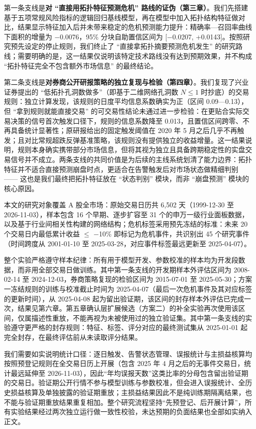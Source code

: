 \documentclass[12pt,a4paper]{ctexart}
\begin{document}
第一条支线是\textbf{对 “直接用拓扑特征预测危机” 路线的证伪（第三章）}。我们先搭建基于五项常规风险指标的逻辑回归基线模型，再在模型中加入拓扑结构特征做对比，结果显示特征加入后并未带来稳定的危机预测能力提升：精确率—召回率曲线下面积的增量为 \(-\)0.0076，95\% 分块自助置信区间为 [\(-\)0.0207, +0.0143]。按照研究预先设定的停止规则，我们终止了 “直接拿拓扑摘要预测危机发生” 的研究路线；需要明确的是，这一结果仅说明该特定技术路线没有达到预期效果，并不构成 “拓扑特征完全不包含额外市场信息” 的最终结论。

第二条支线是\textbf{对券商公开研报策略的独立复现与检验（第四章）}。我们复现了兴业证券提出的 “低拓扑孔洞数做多”（即基于二维网络孔洞数 \(N \le 1\) 时抄底）的交易规则：独立计算发现，该规则的日度平均信息系数确实为正（区间 0.09—0.13），但 “拿到规则就能直接交易” 的可交易性结论未通过进一步检验：在更贴合实际交易决策的信号首次触发口径下，规则的信息系数降至 0.013，且置信区间跨零、不再具备统计显著性；原研报给出的固定触发阈值在 2020 年 5 月之后几乎不再触发；且对比常规超跌反弹基准策略，该规则没有提供独立的收益增量。这一结果说明，规则本身确实携带部分市场信息，但将其视为独立且具备跨期稳定性的实盘交易信号并不成立。两条支线的共同价值是为后续的主线系统划清了能力边界：拓扑特征并不适合直接预测崩盘时点，更适合在告警触发后对市场状态做精细判别 —— 这也是我们最终把拓扑特征放在 “状态判别” 模块，而非 “崩盘预测” 模块的核心原因。

本文的研究对象覆盖 A 股全市场：原始交易日历共 6,502 天（1999-12-30 至 2026-11-03），样本包含 16 个早期、逐步扩容至 31 个的申万一级行业面板数据，以及基于行业间相关性构建的网络结构；危机标签采用预先冻结的标准：未来 20 个交易日内最低累计收益 \(\leq\) \(-\)10\% 即标记为危机事件，共识别出 45 个研究事件（时间跨度从 2001-01-10 至 2025-03-28，对应事件标签最远更新至 2025-04-07）。

整个实验严格遵守样本纪律：所有用于模型开发、参数校准的样本均为开发段数据，而非用全部交易日做训练。其中第一条支线的开发期样本外评估区间为 2008-02-14 至 2024-12-03，券商策略复现的检验区间为 2015-07-01 至 2025-05-30；方案一冻结规则的训练与校准截止时间为 2025-04-07（最后一次危机事件及其对应标签的更新时间），从 2025-04-08 起为留出验证期，该区间的封存样本外评估已完成一次，结果见第六章。第五章确认层扩展候选（方案二）的补全实验再次使用该区间，仅属描述性重放，不能再视为未被使用过的独立验证集。其中第一条支线的实验遵守更严格的封存规则：特征、标签、评分对应的最终测试集从 2025-01-01 起完全封存，在最终评估前从未读取评分结果。

我们需要如实说明统计口径：逐日触发、告警状态管理、误报统计与主损益核算均按照预登记规则在全交易日历上开展（包含 2025 年 4 月之后的无事件交易日，统计最远延伸至 2026-11-03），因此“年均误报天数”这类比率的分母包含留出验证期的交易日。验证期公开行情不参与模型训练与参数校准，但会进入误报统计、全历史损益核算及单独披露的验证期重放；主损益结果因此不是纯训练期隔离结果，也不能与验证期重放结果重复相加。整个研究流程坚持“先预登记、后开展计算”，所有实验结果经过两次独立运行做一致性校验，未达预期的负面结果也全部如实纳入正文。
\end{document}
